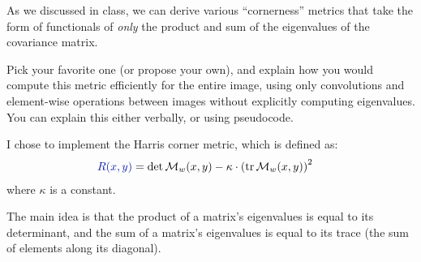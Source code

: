 \begin{problem}
  As we discussed in class, we can derive various ``cornerness'' metrics
  that take the form of functionals of \emph{only} the product
  and sum of the eigenvalues of the covariance matrix.
  
  \step
  Pick your favorite one (or propose your own),
  and explain how you would compute this metric efficiently
  for the entire image, using only convolutions and
  element-wise operations between images
  without explicitly computing eigenvalues.
  You can explain this either verbally, or using pseudocode.
\end{problem}

  
\begin{answer}
  I chose to implement the Harris corner metric, which is defined as:
  \begin{align}
    \zaff{R(x,y)} &= \det \calM_w(x,y) - \kappa \cdot {(\tr \calM_w(x,y))}^2
  \end{align}
  where $\kappa$ is a constant.

  The main idea is that the product of a matrix's eigenvalues is equal to its determinant,
  and the sum of a matrix's eigenvalues is equal to its trace
  (the sum of elements along its diagonal).


\end{answer}
